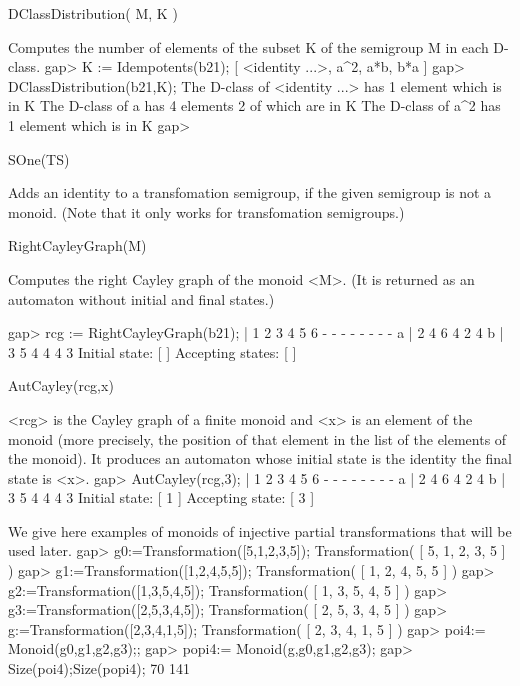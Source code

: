 \> DClassDistribution( M, K )  

Computes the number of elements of the subset K of the semigroup M in each
D-class.  
\beginexample
gap> K := Idempotents(b21);
[ <identity ...>, a^2, a*b, b*a ]
gap> DClassDistribution(b21,K);
The D-class of <identity ...> has 1 element which is in K
The D-class of a has 4 elements 2 of which are in K
The D-class of a^2 has 1 element which is in K
gap> 
\endexample

\> SOne(TS)  

Adds an identity to a transfomation semigroup, if the given semigroup is
 not a monoid. (Note that it only works for transfomation semigroups.)



\> RightCayleyGraph(M)   

Computes the right Cayley graph of the monoid <M>. (It is returned as an
automaton without initial and final states.) 

\beginexample
gap> rcg := RightCayleyGraph(b21);
      |  1  2  3  4  5  6 
   -  -  -  -  -  -  -  - 
   a  |  2  4  6  4  2  4 
   b  |  3  5  4  4  4  3 
Initial state: [  ]
Accepting states: [  ]
\endexample

\>  AutCayley(rcg,x)  

<rcg> is the Cayley graph of a finite monoid and
 <x> is an element of the monoid (more precisely, the position of
 that element in the list of the elements of the monoid). It produces
 an automaton whose initial state is the identity the final state is <x>.
\beginexample
gap> AutCayley(rcg,3);
      |  1  2  3  4  5  6 
   -  -  -  -  -  -  -  - 
   a  |  2  4  6  4  2  4 
   b  |  3  5  4  4  4  3 
Initial state: [ 1 ]
Accepting state: [ 3 ]
\endexample

We give here examples of monoids of injective partial transformations that
will be used later.  
\beginexample
gap> g0:=Transformation([5,1,2,3,5]);
Transformation( [ 5, 1, 2, 3, 5 ] )
gap> g1:=Transformation([1,2,4,5,5]);
Transformation( [ 1, 2, 4, 5, 5 ] )
gap> g2:=Transformation([1,3,5,4,5]);
Transformation( [ 1, 3, 5, 4, 5 ] )
gap> g3:=Transformation([2,5,3,4,5]);
Transformation( [ 2, 5, 3, 4, 5 ] )
gap> g:=Transformation([2,3,4,1,5]);
Transformation( [ 2, 3, 4, 1, 5 ] )
gap> poi4:= Monoid(g0,g1,g2,g3);;
gap> popi4:= Monoid(g,g0,g1,g2,g3);
gap> Size(poi4);Size(popi4);
70
141
\endexample

















